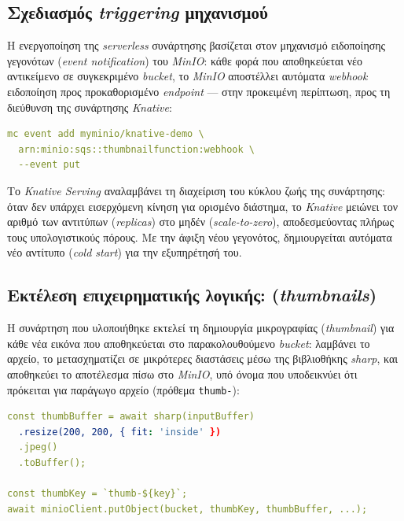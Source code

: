 \subsection{Σχεδιασμός \textit{triggering} μηχανισμού}

Η ενεργοποίηση της \textit{serverless} συνάρτησης βασίζεται στον μηχανισμό ειδοποίησης γεγονότων (\textit{event notification}) του \textit{MinIO}: κάθε φορά που αποθηκεύεται νέο αντικείμενο σε συγκεκριμένο \textit{bucket}, το \textit{MinIO} αποστέλλει αυτόματα \textit{webhook} ειδοποίηση προς προκαθορισμένο \textit{endpoint} --- στην προκειμένη περίπτωση, προς τη διεύθυνση της συνάρτησης \textit{Knative}:

\begin{lstlisting}[language=yaml, caption={Εγγραφή event notification στον MinIO client}]
mc event add myminio/knative-demo \
  arn:minio:sqs::thumbnailfunction:webhook \
  --event put
\end{lstlisting}

Το \textit{Knative Serving} αναλαμβάνει τη διαχείριση του κύκλου ζωής της συνάρτησης: όταν δεν υπάρχει εισερχόμενη κίνηση για ορισμένο διάστημα, το \textit{Knative} μειώνει τον αριθμό των αντιτύπων (\textit{replicas}) στο μηδέν (\textit{scale-to-zero}), αποδεσμεύοντας πλήρως τους υπολογιστικούς πόρους. Με την άφιξη νέου γεγονότος, δημιουργείται αυτόματα νέο αντίτυπο (\textit{cold start}) για την εξυπηρέτησή του.

\subsection{Εκτέλεση επιχειρηματικής λογικής: (\textit{thumbnails})}

Η συνάρτηση που υλοποιήθηκε εκτελεί τη δημιουργία μικρογραφίας (\textit{thumbnail}) για κάθε νέα εικόνα που αποθηκεύεται στο παρακολουθούμενο \textit{bucket}: λαμβάνει το αρχείο, το μετασχηματίζει σε μικρότερες διαστάσεις μέσω της βιβλιοθήκης \textit{sharp}, και αποθηκεύει το αποτέλεσμα πίσω στο \textit{MinIO}, υπό όνομα που υποδεικνύει ότι πρόκειται για παράγωγο αρχείο (πρόθεμα \texttt{thumb-}):

\begin{lstlisting}[language=yaml, caption={Επεξεργασία εικόνας με Sharp για δημιουργία thumbnail}]
const thumbBuffer = await sharp(inputBuffer)
  .resize(200, 200, { fit: 'inside' })
  .jpeg()
  .toBuffer();

const thumbKey = `thumb-${key}`;
await minioClient.putObject(bucket, thumbKey, thumbBuffer, ...);
\end{lstlisting}

